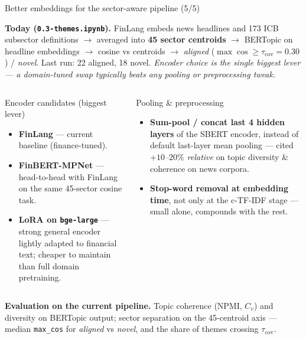 \documentclass[10pt,aspectratio=169]{beamer}
\begin{document}
\begin{frame}[t]{Better embeddings for the sector-aware pipeline (5/5)}
  \footnotesize

  \textbf{Today (\texttt{0.3-themes.ipynb}).}\;
  FinLang embeds news headlines and 173 ICB subsector definitions
  $\rightarrow$ averaged into \textbf{45 sector centroids}
  $\rightarrow$ BERTopic on headline embeddings
  $\rightarrow$ cosine vs centroids
  $\rightarrow$ \emph{aligned} ($\max\!\cos \!\ge\! \tau_{\text{cov}}\!=\!0.30$) / \emph{novel}.\;
  Last run: 22 aligned, 18 novel.\;
  \emph{Encoder choice is the single biggest lever ---
  a domain-tuned swap typically beats any pooling or preprocessing tweak.}

  \vspace{0.10cm}
  \begin{columns}[T,onlytextwidth]
      \begin{block}{Encoder candidates (biggest lever)}
        \footnotesize
        \begin{itemize}\setlength\itemsep{0.04cm}
          \item \textbf{FinLang} --- current baseline (finance-tuned).
          \item \textbf{FinBERT-MPNet} --- head-to-head with FinLang on the same 45-sector cosine task.
          \item \textbf{LoRA on \texttt{bge-large}} --- strong general encoder lightly adapted to financial text; cheaper to maintain than full domain pretraining.
        \end{itemize}
      \end{block}

      \begin{block}{Pooling \& preprocessing}
        \footnotesize
        \begin{itemize}\setlength\itemsep{0.04cm}
          \item \textbf{Sum-pool / concat last 4 hidden layers} of the SBERT encoder, instead of default last-layer mean pooling --- cited \emph{$+10$--$20\%$ relative} on topic diversity \& coherence on news corpora.
          \item \textbf{Stop-word removal at embedding time}, not only at the c-TF-IDF stage --- small alone, compounds with the rest.
        \end{itemize}
      \end{block}
  \end{columns}

  \vspace{0.15cm}
  \textbf{Evaluation on the current pipeline.}\;
  Topic coherence (NPMI, $C_v$) and diversity on BERTopic output;
  sector separation on the 45-centroid axis ---
  median \texttt{max\_cos} for \emph{aligned} vs \emph{novel}, and the share of themes crossing $\tau_{\text{cov}}$.

\end{frame}
\end{document}
